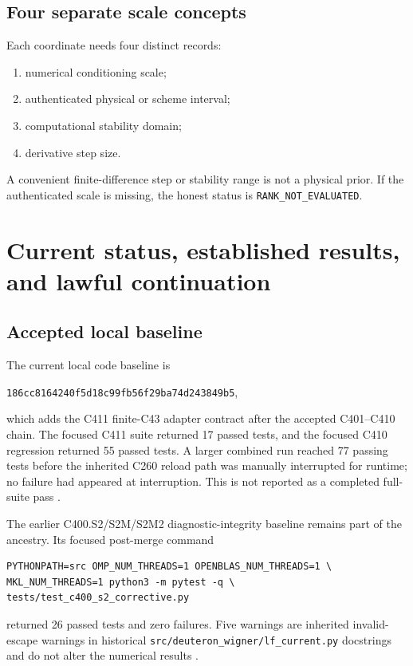 \documentclass[11pt,oneside]{book}
\newcommand{\codepath}[1]{\nolinkurl{#1}}
\begin{document}
\section{Four separate scale concepts}

Each coordinate needs four distinct records:
\begin{enumerate}[label=(\alph*)]
 \item numerical conditioning scale;
 \item authenticated physical or scheme interval;
 \item computational stability domain;
 \item derivative step size.
\end{enumerate}
A convenient finite-difference step or stability range is not a physical prior.  If the authenticated scale is missing, the honest status is \texttt{RANK\_NOT\_EVALUATED}.

\chapter{Current status, established results, and lawful continuation}
\label{chap:status}

\section{Accepted local baseline}

The current local code baseline is
\begin{center}
\texttt{186cc8164240f5d18c99fb56f29ba74d243849b5},
\end{center}
which adds the C411 finite-C43 adapter contract after the accepted C401--C410 chain.  The focused C411 suite returned 17 passed tests, and the focused C410 regression returned 55 passed tests.  A larger combined run reached 77 passing tests before the inherited C260 reload path was manually interrupted for runtime; no failure had appeared at interruption.  This is not reported as a completed full-suite pass \cite{DWC401C410Record2026,DWC411Record2026}.

The earlier C400.S2/S2M/S2M2 diagnostic-integrity baseline remains part of the ancestry.  Its focused post-merge command
\begin{lstlisting}
PYTHONPATH=src OMP_NUM_THREADS=1 OPENBLAS_NUM_THREADS=1 \
MKL_NUM_THREADS=1 python3 -m pytest -q \
tests/test_c400_s2_corrective.py
\end{lstlisting}
returned 26 passed tests and zero failures.  Five warnings are inherited invalid-escape warnings in historical \codepath{src/deuteron_wigner/lf_current.py} docstrings and do not alter the numerical results \cite{DWC400S2Record2026}.
\end{document}
